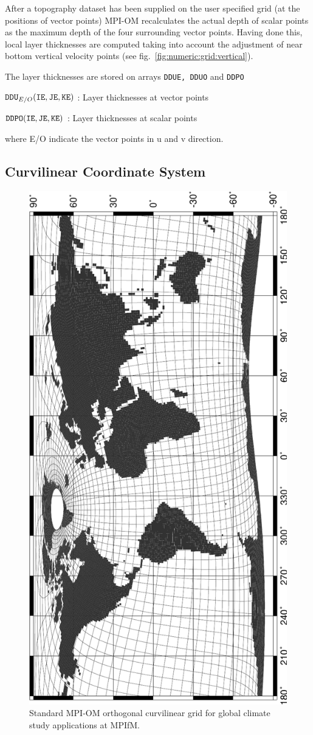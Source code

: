 After a  topography dataset has been supplied on the user specified
grid (at the positions of vector points) MPI-OM recalculates the actual depth of scalar points as
the maximum depth of the four surrounding vector points.
Having done this, local layer thicknesses are computed  taking into account
the adjustment of near bottom vertical velocity points (see fig.\ \ref{fig:numeric:grid:vertical}).

The layer thicknesses are stored on arrays {\tt DDUE, DDUO} and {\tt DDPO}
\begin{description}
\item {${\tt DDU}_{E/O}{\tt (IE,JE,KE)}$} : Layer thicknesses at vector points
\item {${\tt DDPO}{\tt (IE,JE,KE)}$} : Layer thicknesses at scalar points
\end{description}
where E/O indicate the vector points in u and v direction.


\subsection{Curvilinear Coordinate System}
\label{ch:numeric:curvilinear}


\begin{figure}[!tb]%
\centerline{\hbox{\includegraphics[height=14.cm,angle=-90,clip]{grob_grid}}}
\caption{Standard \mbox{MPI-OM} orthogonal curvilinear grid for global climate study applications at MPIfM.}
\label{fig:numeric:antagrid}
\end{figure}

